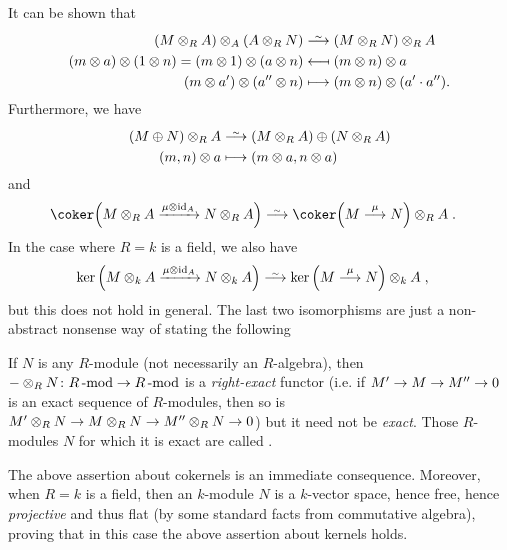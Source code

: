 \documentclass[a4paper,parskip=half,numbers=enddot, DIV=12]{scrreprt}
\begin{document}
It can be shown that
\begin{align*}
    (M\otimes_R A)\otimes_A(A\otimes_R N)&\isomorphism (M\otimes_R N) \otimes_R A\\
    (m\otimes a)\otimes(1\otimes n) = (m\otimes 1)\otimes(a\otimes n) &\longmapsfrom (m\otimes n)\otimes a\\
    (m\otimes a')\otimes(a''\otimes n) &\longmapsto (m\otimes n)\otimes(a'\cdot a'').
\end{align*}
Furthermore, we have
\begin{align*}
    (M\oplus N) \otimes_R A &\isomorphism (M\otimes_R A)\oplus(N\otimes_R A)\\
    (m,n)\otimes a &\longmapsto (m\otimes a, n\otimes a)
\end{align*}
and 
\begin{align*}
    \coker\Big(M\otimes_R A\xrightarrow{\mu\otimes \id_A} N\otimes_R A\Big) &\isomorphism \coker\Big(M\morphism[\mu] N\Big)\otimes_R A\;.
\end{align*}
In the case where $R=k$ is a field, we also have 
\begin{align*}
    \ker\Big(M\otimes_kA \xrightarrow{\mu\otimes \id_A} N\otimes_k A\Big) &\isomorphism \ker\left(M\morphism[\mu] N \right)\otimes_k A\;,
\end{align*}
but this does not hold in general. The last two isomorphisms are just a non-abstract nonsense way of stating the following
\begin{fact}
	If $N$ is any $R$-module (not necessarily an $R$-algebra), then $-\otimes_RN\colon R\cat{-mod}\morphism R\cat{-mod}$ is a \emph{right-exact} functor (i.e. if $M'\morphism M\morphism M''\morphism0$ is an exact sequence of $R$-modules, then so is $M'\otimes_RN\morphism M\otimes_RN\morphism M''\otimes_RN\morphism 0$) but it need not be \emph{exact}. Those $R$-modules $N$ for which it is exact are called .
\end{fact}
The above assertion about cokernels is an immediate consequence. Moreover, when $R=k$ is a field, then an $k$-module $N$ is a $k$-vector space, hence free, hence \emph{projective} and thus flat (by some standard facts from commutative algebra), proving that in this case the above assertion about kernels holds.
\end{document}
